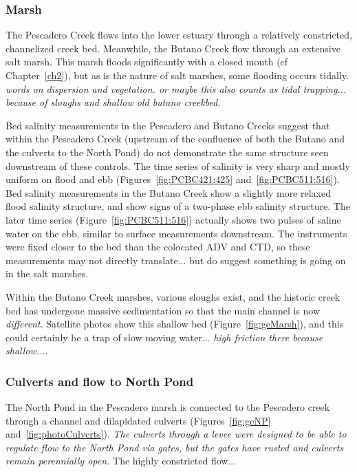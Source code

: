 \subsubsection{Marsh}
The Pescadero Creek flows into the lower estuary through a relatively constricted, channelized creek bed.  Meanwhile, the Butano Creek flow through an extensive salt marsh. This marsh floods significantly with a closed mouth (cf Chapter~\ref{ch2}), but as is the nature of salt marshes, some flooding occurs tidally. \emph{words on dispersion and vegetation. or maybe this also counts as tidal trapping... because of sloughs and shallow old butano creekbed}. 

Bed salinity measurements in the Pescadero and Butano Creeks suggest that within the Pescadero Creek (upstream of the confluence of both the Butano and the culverts to the North Pond) do not demonstrate the same structure seen downstream of these controls. The time series of salinity is very sharp and mostly uniform on flood and ebb (Figures~\ref{fig:PCBC421:425} and~\ref{fig:PCBC511:516}). Bed salinity measurements in the Butano Creek show a slightly more relaxed flood salinity structure, and show signs of a two-phase ebb salinity structure. The later time series (Figure~\ref{fig:PCBC511:516}) actually shows two pulses of saline water on the ebb, similar to surface measurements downstream.  The instruments were fixed closer to the bed than the colocated ADV and CTD, so these measurements may not directly translate... but do suggest something is going on in the salt marshes.  

Within the Butano Creek marshes, various sloughs exist, and the historic creek bed has undergone massive sedimentation so that the main channel is now \emph{different}. Satellite photos show this shallow bed (Figure~\ref{fig:geMarsh}), and this could certainly be a trap of slow moving water... \emph{high friction there because shallow...}. 

\subsubsection{Culverts and flow to North Pond}
The North Pond in the Pescadero marsh is connected to the Pescadero creek through a channel and dilapidated culverts (Figures~\ref{fig:geNP} and~\ref{fig:photoCulverts}). \emph{The culverts through a levee were designed to be able to regulate flow to the North Pond via gates, but the gates have rusted and culverts remain perennially open.} The highly constricted flow... 

